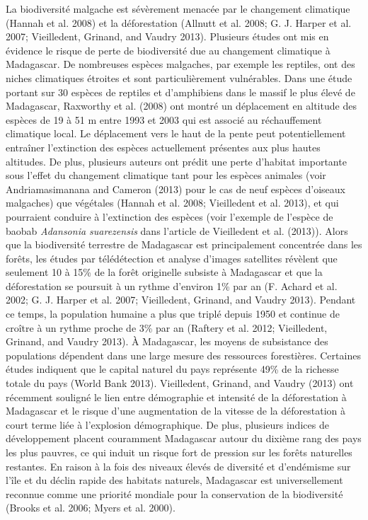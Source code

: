 \documentclass[12pt,]{article}
\begin{document}
La biodiversité malgache est sévèrement menacée par le changement
climatique (Hannah et al. 2008) et la déforestation (Allnutt et al.
2008; G. J. Harper et al. 2007; Vieilledent, Grinand, and Vaudry 2013).
Plusieurs études ont mis en évidence le risque de perte de biodiversité
due au changement climatique à Madagascar. De nombreuses espèces
malgaches, par exemple les reptiles, ont des niches climatiques étroites
et sont particulièrement vulnérables. Dans une étude portant sur 30
espèces de reptiles et d'amphibiens dans le massif le plus élevé de
Madagascar, Raxworthy et al. (2008) ont montré un déplacement en
altitude des espèces de 19 à 51 m entre 1993 et 2003 qui est associé au
réchauffement climatique local. Le déplacement vers le haut de la pente
peut potentiellement entraîner l'extinction des espèces actuellement
présentes aux plus hautes altitudes. De plus, plusieurs auteurs ont
prédit une perte d'habitat importante sous l'effet du changement
climatique tant pour les espèces animales (voir Andriamasimanana and
Cameron (2013) pour le cas de neuf espèces d'oiseaux malgaches) que
végétales (Hannah et al. 2008; Vieilledent et al. 2013), et qui
pourraient conduire à l'extinction des espèces (voir l'exemple de
l'espèce de baobab \emph{Adansonia suarezensis} dans l'article de
Vieilledent et al. (2013)). Alors que la biodiversité terrestre de
Madagascar est principalement concentrée dans les forêts, les études par
télédétection et analyse d'images satellites révèlent que seulement 10 à
15\% de la forêt originelle subsiste à Madagascar et que la
déforestation se poursuit à un rythme d'environ 1\% par an (F. Achard et
al. 2002; G. J. Harper et al. 2007; Vieilledent, Grinand, and Vaudry
2013). Pendant ce temps, la population humaine a plus que triplé depuis
1950 et continue de croître à un rythme proche de 3\% par an (Raftery et
al. 2012; Vieilledent, Grinand, and Vaudry 2013). À Madagascar, les
moyens de subsistance des populations dépendent dans une large mesure
des ressources forestières. Certaines études indiquent que le capital
naturel du pays représente 49\% de la richesse totale du pays (World
Bank 2013). Vieilledent, Grinand, and Vaudry (2013) ont récemment
souligné le lien entre démographie et intensité de la déforestation à
Madagascar et le risque d'une augmentation de la vitesse de la
déforestation à court terme liée à l'explosion démographique. De plus,
plusieurs indices de développement placent couramment Madagascar autour
du dixième rang des pays les plus pauvres, ce qui induit un risque fort
de pression sur les forêts naturelles restantes. En raison à la fois des
niveaux élevés de diversité et d'endémisme sur l'île et du déclin rapide
des habitats naturels, Madagascar est universellement reconnue comme une
priorité mondiale pour la conservation de la biodiversité (Brooks et al.
2006; Myers et al. 2000).
\end{document}
